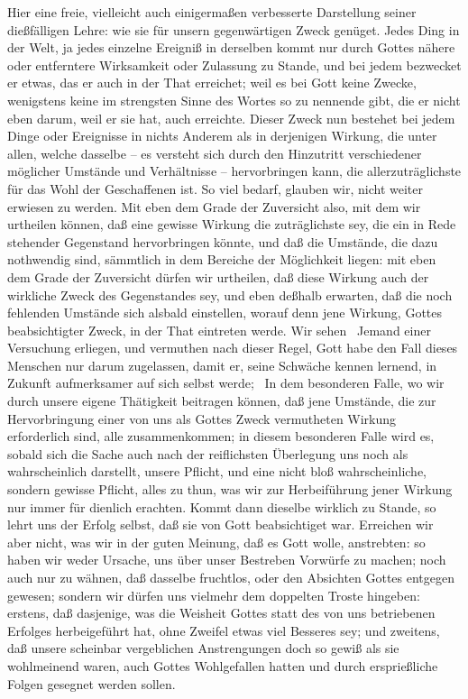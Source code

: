 Hier eine freie, vielleicht auch einigermaßen verbesserte Darstellung seiner dießfälligen Lehre: wie sie für unsern gegenwärtigen Zweck genüget. Jedes Ding in der Welt, ja jedes einzelne Ereigniß in derselben kommt nur durch Gottes nähere oder entferntere Wirksamkeit oder Zulassung zu Stande, und bei jedem bezwecket er etwas, das er auch in der That erreichet; weil es bei Gott keine Zwecke, wenigstens keine im strengsten Sinne des Wortes so zu nennende gibt, die er nicht eben darum, weil er sie hat, auch erreichte. Dieser Zweck nun bestehet bei jedem Dinge oder Ereignisse in nichts Anderem als in derjenigen Wirkung, die unter allen, welche dasselbe -- es versteht sich durch den Hinzutritt verschiedener möglicher Umstände und Verhältnisse -- hervorbringen kann, die allerzuträglichste für das Wohl der Geschaffenen ist. So viel bedarf, glauben wir, nicht weiter erwiesen zu werden. Mit eben dem Grade der Zuversicht also, mit dem wir urtheilen können, daß eine gewisse Wirkung die zuträglichste sey, die ein in Rede stehender Gegenstand hervorbringen könnte, und daß die Umstände, die dazu nothwendig sind, sämmtlich in dem Bereiche der Möglichkeit liegen: mit eben dem Grade der Zuversicht dürfen wir urtheilen, daß diese Wirkung auch der wirkliche Zweck des Gegenstandes sey, und eben deßhalb erwarten, daß die noch fehlenden Umstände sich alsbald einstellen, worauf denn jene Wirkung, Gottes beabsichtigter Zweck, in der That eintreten werde. Wir sehen \zB\ Jemand einer Versuchung erliegen, und vermuthen nach dieser Regel, Gott habe den Fall dieses Menschen nur darum zugelassen, damit er, seine Schwäche kennen lernend, in Zukunft aufmerksamer auf sich selbst werde; \usw\ In dem besonderen Falle, wo wir durch unsere eigene Thätigkeit beitragen können, daß jene Umstände, die zur Hervorbringung einer von uns als Gottes Zweck vermutheten Wirkung erforderlich sind, alle zusammenkommen; in diesem besonderen Falle wird es, sobald sich die Sache auch nach der reiflichsten Überlegung uns noch als wahrscheinlich darstellt, unsere Pflicht, und eine nicht bloß wahrscheinliche, sondern gewisse Pflicht, alles zu thun,  was wir zur Herbeiführung jener Wirkung nur immer für dienlich erachten. Kommt dann dieselbe wirklich zu Stande, so lehrt uns der Erfolg selbst, daß sie von Gott beabsichtiget war. Erreichen wir aber nicht, was wir in der guten Meinung, daß es Gott wolle, anstrebten: so haben wir weder Ursache, uns über unser Bestreben Vorwürfe zu machen; noch auch nur  zu wähnen, daß dasselbe fruchtlos, oder den Absichten Gottes entgegen gewesen; sondern wir dürfen uns vielmehr dem doppelten Troste hingeben: erstens, daß dasjenige, was die Weisheit Gottes statt des von uns betriebenen Erfolges herbeigeführt hat, ohne Zweifel etwas viel Besseres sey; und zweitens, daß unsere scheinbar vergeblichen Anstrengungen doch so gewiß als sie wohlmeinend waren, auch Gottes Wohlgefallen hatten und durch ersprießliche Folgen gesegnet werden sollen. \par
